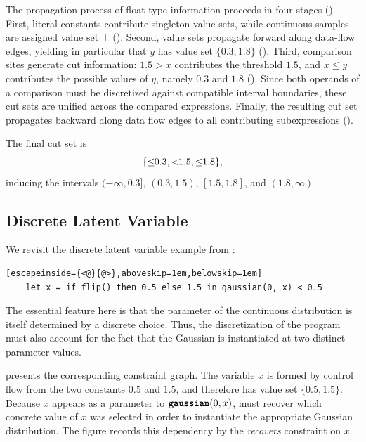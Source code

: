 The propagation process of float type information proceeds in four stages (). First, literal constants contribute singleton value sets, while continuous samples are assigned value set $\top$ (). Second, value sets propagate forward along data-flow edges, yielding in particular that $y$ has value set $\{0.3,1.8\}$ (). Third, comparison sites generate cut information: $1.5 > x$ contributes the threshold $1.5$, and $x \leq y$ contributes the possible values of $y$, namely $0.3$ and $1.8$ (). Since both operands of a comparison must be discretized against compatible interval boundaries, these cut sets are unified across the compared expressions. Finally, the resulting cut set propagates backward along data flow edges to all contributing subexpressions ().

The final cut set is
\[
\{\leq\!\!{0.3}, <\!\!{1.5}, \leq\!\!{1.8}\},
\]
inducing the intervals $(-\infty,0.3]$, $(0.3,1.5)$, $[1.5,1.8]$, and $(1.8,\infty)$. 


\subsection{Discrete Latent Variable}\label{app:examples:5}

We revisit the discrete latent variable example from :
\begin{lstlisting}[escapeinside={<@}{@>},aboveskip=1em,belowskip=1em]
    let x = if flip() then 0.5 else 1.5 in gaussian(0, x) < 0.5
\end{lstlisting}
The essential feature here is that the parameter of the continuous distribution is itself determined by a discrete choice. Thus, the discretization of the program must also account for the fact that the Gaussian is instantiated at two distinct parameter values.



 presents the corresponding constraint graph. The variable $x$ is formed by control flow from the two constants $0.5$ and $1.5$, and therefore has value set $\{0.5,1.5\}$. Because $x$ appears as a parameter to $\textnormal{\ttfamily\bfseries gaussian}(0,x)$, \Slice{} must recover which concrete value of $x$ was selected in order to instantiate the appropriate Gaussian distribution. The figure records this dependency by the \emph{recovers} constraint on $x$.


